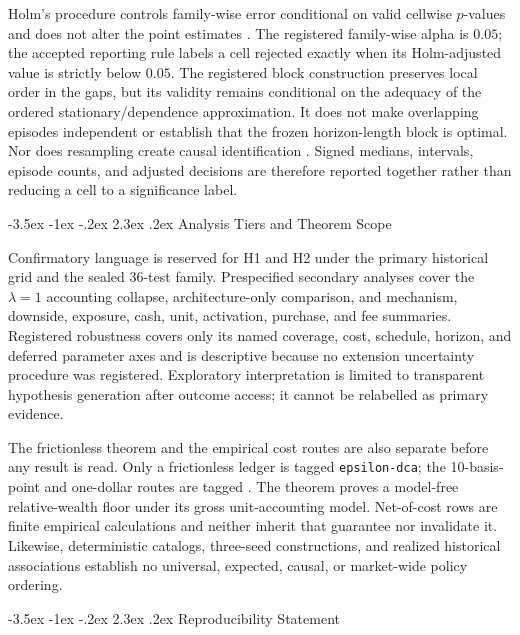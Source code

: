 \documentclass[12pt,a4paper,oneside]{report}
\makeatletter
\renewcommand\section{\@startsection{section}{1}{\z@}%
  {-3.5ex \@plus -1ex \@minus -.2ex}%
  {2.3ex \@plus .2ex}%
  {\normalfont\fontsize{14}{17}\selectfont\bfseries}}
\makeatother
\begin{document}
Holm's procedure controls family-wise error conditional on valid cellwise
$p$-values and does not alter the point estimates \citep{holm1979}. The
registered family-wise alpha is $0.05$; the accepted reporting rule labels a
cell rejected exactly when its Holm-adjusted value is strictly below $0.05$.
The registered block construction preserves local order in the gaps, but its
validity remains conditional on the adequacy of the ordered
stationary/dependence approximation. It does not make overlapping episodes
independent or establish that the frozen horizon-length block is optimal. Nor
does resampling create causal identification \citep{hernanrobins2020}. Signed
medians, intervals, episode counts, and adjusted decisions are therefore
reported together rather than reducing a cell to a significance label.

\section{Analysis Tiers and Theorem Scope}
\label{sec:method-analysis-tiers}

Confirmatory language is reserved for H1 and H2 under the primary historical
grid and the sealed 36-test family. Prespecified secondary analyses cover the
$\lambda=1$ accounting collapse, architecture-only comparison, and mechanism,
downside, exposure, cash, unit, activation, purchase, and fee summaries.
Registered robustness covers only its named coverage, cost, schedule, horizon,
and deferred parameter axes and is descriptive because no extension uncertainty
procedure was registered. Exploratory interpretation is limited to transparent
hypothesis generation after outcome access; it cannot be relabelled as primary
evidence.

The frictionless theorem and the empirical cost routes are also separate
before any result is read. Only a frictionless ledger is tagged
\texttt{epsilon-dca}; the 10-basis-point and one-dollar routes are tagged
. The theorem proves a model-free
relative-wealth floor under its gross unit-accounting model. Net-of-cost rows
are finite empirical calculations and neither inherit that guarantee nor
invalidate it. Likewise, deterministic catalogs, three-seed constructions,
and realized historical associations establish no universal, expected,
causal, or market-wide policy ordering.

\section{Reproducibility Statement}
\label{sec:method-reproducibility}
\end{document}
